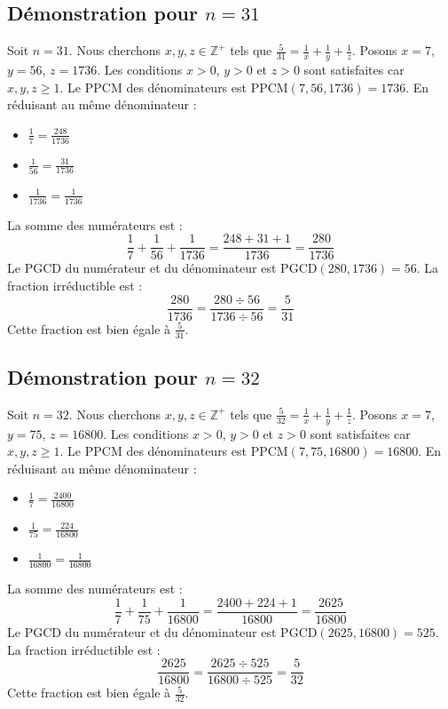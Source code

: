 \documentclass[11pt,a4paper]{article}
\begin{document}
\subsection{Démonstration pour $n = 31$}
Soit $n = 31$. Nous cherchons $x, y, z \in \mathbb{Z}^{+}$ tels que $\frac{5}{31} = \frac{1}{x} + \frac{1}{y} + \frac{1}{z}$.
Posons $x = 7$, $y = 56$, $z = 1736$.
Les conditions $x > 0$, $y > 0$ et $z > 0$ sont satisfaites car $x, y, z \geq 1$.
Le PPCM des dénominateurs est $\text{PPCM}(7, 56, 1736) = 1736$.
En réduisant au même dénominateur :
\begin{itemize}
    \item $\frac{1}{7} = \frac{248}{1736}$
    \item $\frac{1}{56} = \frac{31}{1736}$
    \item $\frac{1}{1736} = \frac{1}{1736}$
\end{itemize}
La somme des numérateurs est :
$$ \frac{1}{7} + \frac{1}{56} + \frac{1}{1736} = \frac{248 + 31 + 1}{1736} = \frac{280}{1736} $$
Le PGCD du numérateur et du dénominateur est $\text{PGCD}(280, 1736) = 56$.
La fraction irréductible est :
$$ \frac{280}{1736} = \frac{280 \div 56}{1736 \div 56} = \frac{5}{31} $$
Cette fraction est bien égale à $\frac{5}{31}$.

\subsection{Démonstration pour $n = 32$}
Soit $n = 32$. Nous cherchons $x, y, z \in \mathbb{Z}^{+}$ tels que $\frac{5}{32} = \frac{1}{x} + \frac{1}{y} + \frac{1}{z}$.
Posons $x = 7$, $y = 75$, $z = 16800$.
Les conditions $x > 0$, $y > 0$ et $z > 0$ sont satisfaites car $x, y, z \geq 1$.
Le PPCM des dénominateurs est $\text{PPCM}(7, 75, 16800) = 16800$.
En réduisant au même dénominateur :
\begin{itemize}
    \item $\frac{1}{7} = \frac{2400}{16800}$
    \item $\frac{1}{75} = \frac{224}{16800}$
    \item $\frac{1}{16800} = \frac{1}{16800}$
\end{itemize}
La somme des numérateurs est :
$$ \frac{1}{7} + \frac{1}{75} + \frac{1}{16800} = \frac{2400 + 224 + 1}{16800} = \frac{2625}{16800} $$
Le PGCD du numérateur et du dénominateur est $\text{PGCD}(2625, 16800) = 525$.
La fraction irréductible est :
$$ \frac{2625}{16800} = \frac{2625 \div 525}{16800 \div 525} = \frac{5}{32} $$
Cette fraction est bien égale à $\frac{5}{32}$.
\end{document}
